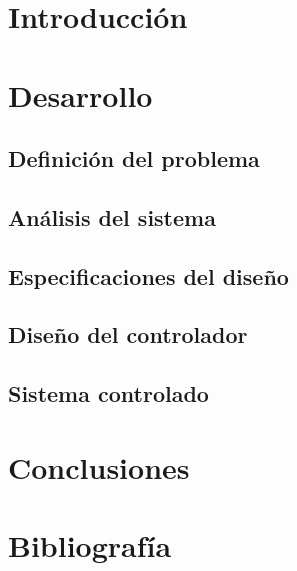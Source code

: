 \documentclass[14pt,a4paper]{article}
\begin{document}
	
	
	\tableofcontents
	
	\newpage
	
	\section{Introducción}
	
	
	\section{Desarrollo}
	
	\subsection{Definición del problema}
	
	
	\subsection{Análisis del sistema}
	
	
	\subsection{Especificaciones del diseño}
	
	
	\subsection{Diseño del controlador}
	
	 
	\subsection{Sistema controlado}
	
	
	\clearpage
	\section{Conclusiones}
	
	
	
	\newpage	
	\section{Bibliografía}
	
	
\end{document}
